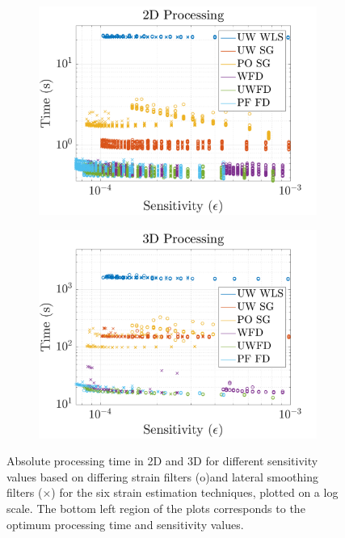 \begin{figure}[b!]
	\centering
	\begin{subfigure}{0.49\textwidth}
		\centering
		\includegraphics[width=\textwidth]{figures/sensitivity_2dtime.png}
	\end{subfigure}
	\begin{subfigure}{0.49\textwidth}
		\centering
		\includegraphics[width=\textwidth]{figures/sensitivity_3dtime.png}
	\end{subfigure}
	\caption{Absolute processing time in 2D and 3D for different sensitivity values based on differing strain filters (o)and lateral smoothing filters ($\times$) for the six strain estimation techniques, plotted on a log scale. The bottom left region of the plots corresponds to the optimum processing time and sensitivity values.}
	\label{sensitivity_time}
\end{figure}

